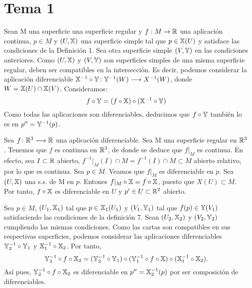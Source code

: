 \documentclass[GAP.tex]{subfiles}
\begin{document}
\chapter{Tema 1}
\begin{dem}[Proposición 2] Sean M una superficie una superficie regular y $f:M\to\mathbb{R}$ una aplicación continua, $p\in M$ y $(U,\mathbb{X})$ una superficie simple tal que $p \in \mathbb{X}(U)$ y satisface las condiciones de la Definición 1. Sea otra superficie simple $(V,\mathbb{Y})$ en las condiciones anteriores. Como $(U,\mathbb{X})$ y $(V,\mathbb{Y})$ son superficies simples de una misma superficie regular, deben ser compatibles en la intersección. Es decir, podemos considerar la aplicación diferenciable $\mathbb{X}^{-1}\circ \mathbb{Y} \colon{\mathbb{Y}^{-1}(W)}\longrightarrow{X^{-1}(W)}$, donde $W=\mathbb{X}(U)\cap\mathbb{X}(V)$. Consideramos:
\[
f\circ \mathbb{Y} = (f \circ \mathbb{X})\circ (\mathbb{X}^{-1}\circ \mathbb{Y})
\]
Como todas las aplicaciones son diferenciables, deducimos que $f\circ \mathbb{Y}$ también lo es en $p''=\mathbb{Y}^{-1}(p)$.

\QED
\end{dem}
\begin{dem}[Proposición 3] Sea $f\colon{\mathbb{R}^3}\longrightarrow{\mathbb{R}}$ una aplicación diferenciable. Sea M una superficie regular en $\mathbb{R}^3$. Tenemos que $f$ es continua en $\mathbb{R}^3$, de donde se deduce que $f|_M$ es continua. En efecto, sea $I\subset \mathbb{R}$ abierto, $f^{-1}|_M(I)\cap M = f^{-1}(I)\cap M  \subset M$ abierto relativo, por lo que es continua. Sea $p\in M$. Veamos que $f|_M$ es diferenciable en $p$. Sea $(U,\mathbb{X})$ una s.s. de M en $p$. Entones $f|_M \circ \mathbb{X} = f \circ \mathbb{X}$, puesto que $X(U)\subset M$. Por tanto, $f\circ \mathbb{X}$ es diferenciable en $U$ y $p'\in U \subset \mathbb{R}^2$ abierto.\QED
\end{dem}
\begin{dem}[Proposición 9] 
Sea $p\in M$, $(U_1,\mathbb{X}_1)$ tal que $p\in\mathbb{X}_1(U_1)$ y $(V_1,\mathbb{Y}_1)$ tal que $f(p)\in\mathbb{Y}(V_1)$ satisfaciendo las condiciones de la definición 7. Sean  $(U_2,\mathbb{X}_2)$ y $(V_2,\mathbb{Y}_2)$ cumpliendo las mismas condiciones. Como las cartas son compatibles en sus respectivas superficies, podemos considerar las aplicaciones diferenciables $\mathbb{Y}_2^{-1}\circ \mathbb{Y}_1$ y $\mathbb{X}_1^{-1}\circ \mathbb{X}_2$. Por tanto, $$\mathbb{Y}_2^{-1}\circ f\circ \mathbb{X}_2=(\mathbb{Y}_2^{-1}\circ \mathbb{Y}_1)\circ (\mathbb{Y}_1^{-1}\circ f\circ\mathbb{X})\circ(\mathbb{X}_1^{-1}\circ \mathbb{X}_2).$$
Así pues, $\mathbb{Y}_2^{-1}\circ f\circ \mathbb{X}_2$ es diferenciable en $p''=\mathbb{X}_2^{-1}(p)$ por ser composición de diferenciables.\QED
\end{dem}
\end{document}
